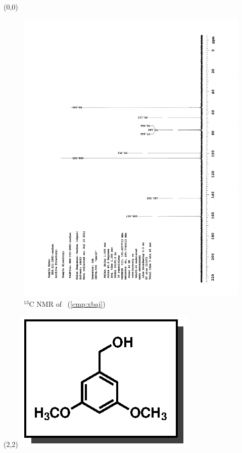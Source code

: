 \clearpage
\begin{textblock}{20}(0,0)
\begin{figure}[htb]
\caption{$^{13}$C NMR of  \CMPxbaj\ (\ref{cmp:xbaj})}
\includegraphics[scale=0.75, trim = 0mm 0mm 0mm 5mm,
clip]{chp_singlecarbon/images/nmr/xbajC}
\vspace{-100pt}
\end{figure}
\end{textblock}
\begin{textblock}{1}(2,2)
\includegraphics[scale=0.8, angle=90]{chp_singlecarbon/images/xbaj}
\end{textblock}
\clearpage

